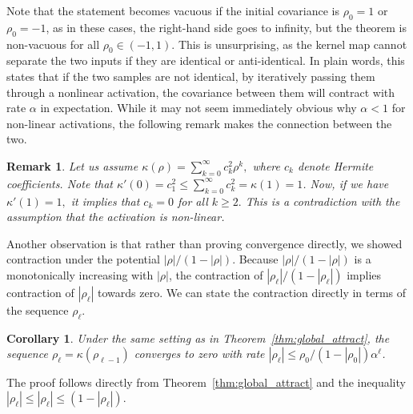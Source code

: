 \documentclass[twoside]{article}
\newcommand{\E}{\mathbb{E}}
\newtheorem{theorem}{Theorem}
\newtheorem{remark}{Remark}
\newtheorem{corollary}{Corollary}
\theoremstyle{definition}
\begin{document}
Note that the statement becomes vacuous if the initial covariance is $\rho_0 = 1$ or $\rho_0 = -1$, as in these cases, the right-hand side goes to infinity, but the theorem is non-vacuous for all $\rho_0\in(-1,1).$ This is unsurprising, as the kernel map cannot separate the two inputs if they are identical or anti-identical. In plain words, this states that if the two samples are not identical, by iteratively passing them through a nonlinear activation, the covariance between them will contract with rate $\alpha$ in expectation.  While it may not seem immediately obvious why $\alpha < 1$ for non-linear activations, the following remark makes the connection between the two.

\begin{remark}
    \label{rem:contraction_rate}
    Let us assume $\kappa(\rho)=\sum_{k=0}^\infty c_k^2\rho^k,$ where $c_k$ denote Hermite coefficients. Note that $\kappa'(0) = c_1^2 \le \sum_{k=0}^\infty c_k^2 = \kappa(1)=1$. Now, if we have $\kappa'(1)=1,$ it implies that $c_k=0$ for all $k\ge 2.$ This is a contradiction with the assumption that the activation is non-linear.  
\end{remark}


Another observation is that rather than proving convergence directly, we showed contraction under the potential $|\rho|/(1-|\rho|).$ Because $|\rho|/(1-|\rho|)$ is a monotonically increasing with $|\rho|$, the contraction of $|\rho_\ell|/(1-|\rho_\ell|)$ implies contraction of $|\rho_\ell|$ towards zero. We can state the contraction directly in terms of the sequence $\rho_\ell $.

\begin{corollary}
Under the same setting as in Theorem~\ref{thm:global_attract}, the sequence $\rho_\ell = \kappa(\rho_{\ell-1})$ converges to zero with rate $|\rho_\ell| \le \rho_0/(1-|\rho_0|) \alpha^{\ell}$.
\end{corollary}

The proof follows directly from Theorem~\ref{thm:global_attract} and the inequality $|\rho_\ell| \le |\rho_\ell|\le (1-|\rho_\ell|).$ 



\end{document}

